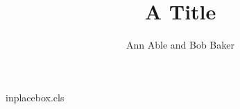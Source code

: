 \begin{filecontents*}[overwrite]{inplacebox.cls}
\newenvironment{indented}{\begin{list}{}{\leftmargin=2em\itemsep=0pt}}{\end{list}}
\newcommand{\address}[1]{\begin{indented}\item[]\normalsize #1\end{indented}}
\def\email#1{\vspace*{5pt}\address{E-mail: #1}}
\def\affil#1{{\small #1}\\}
\newtheorem{thm}{Theorem}
\end{filecontents*}
\documentclass{inplacebox}

\title{A Title}
\author{Ann Able and Bob Baker}
\address{Univ A, Town}
Text before\footnote{\email{fn@x.org}} the title.
\begin{thm}\address{Lab T, Place} holds.\end{thm}
\begin{itemize}\item {}\end{itemize}
\begin{minipage}{5cm}\end{minipage}

